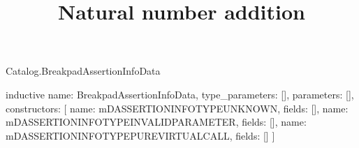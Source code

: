 \begin{lexlean}{Catalog.BreakpadAssertionInfoData}
\title{Natural number addition}
\begin{semanticmodule}
inductive{
  name: BreakpadAssertionInfoData,
  type_parameters: [],
  parameters: [],
  constructors: [
    {name: mDASSERTIONINFOTYPEUNKNOWN, fields: []},
    {name: mDASSERTIONINFOTYPEINVALIDPARAMETER, fields: []},
    {name: mDASSERTIONINFOTYPEPUREVIRTUALCALL, fields: []}
  ]
}
\end{semanticmodule}
\end{lexlean}
